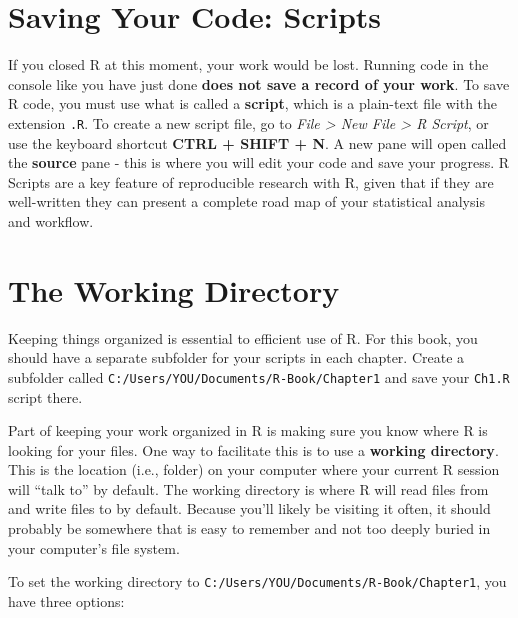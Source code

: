 \documentclass[]{book}
\theoremstyle{definition}
\theoremstyle{definition}
\theoremstyle{definition}
\theoremstyle{remark}
\begin{document}
\section{Saving Your Code: Scripts}\label{scripts}

If you closed R at this moment, your work would be lost. Running code in
the console like you have just done \textbf{does not save a record of
your work}. To save R code, you must use what is called a
\textbf{script}, which is a plain-text file with the extension
\texttt{.R}. To create a new script file, go to \emph{File
\textgreater{} New File \textgreater{} R Script}, or use the keyboard
shortcut \textbf{CTRL + SHIFT + N}. A new pane will open called the
\textbf{source} pane - this is where you will edit your code and save
your progress. R Scripts are a key feature of reproducible research with
R, given that if they are well-written they can present a complete road
map of your statistical analysis and workflow.

\section{The Working Directory}\label{working-dir}

Keeping things organized is essential to efficient use of R. For this
book, you should have a separate subfolder for your scripts in each
chapter. Create a subfolder called
\texttt{C:/Users/YOU/Documents/R-Book/Chapter1} and save your
\texttt{Ch1.R} script there.

Part of keeping your work organized in R is making sure you know where R
is looking for your files. One way to facilitate this is to use a
\textbf{working directory}. This is the location (i.e., folder) on your
computer where your current R session will ``talk to'' by default. The
working directory is where R will read files from and write files to by
default. Because you'll likely be visiting it often, it should probably
be somewhere that is easy to remember and not too deeply buried in your
computer's file system.

To set the working directory to
\texttt{C:/Users/YOU/Documents/R-Book/Chapter1}, you have three options:
\end{document}
